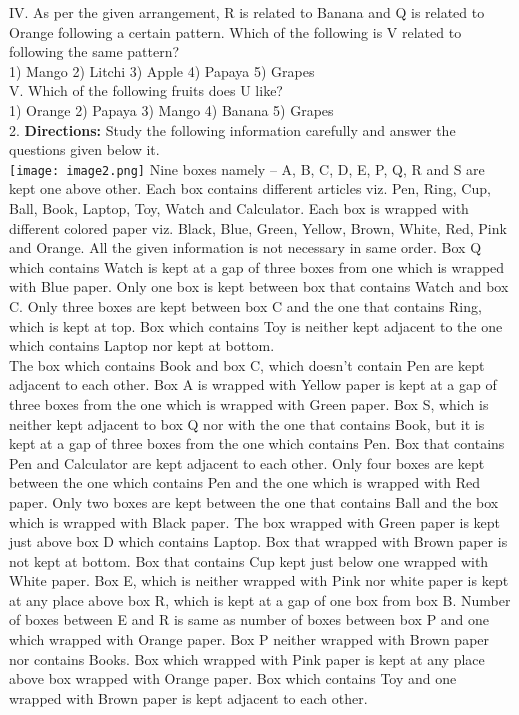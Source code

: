 \documentclass[
]{article}
\begin{document}
IV. As per the given arrangement, R is related to Banana and Q is related to Orange
following a certain pattern. Which of the following is V related to following the same
pattern?\\
1) Mango \hspace{2mm}2) Litchi \hspace{2mm}3) Apple \hspace{2mm}4) Papaya \hspace{2mm}5) Grapes\\

V. Which of the following fruits does U like?\\
1) Orange \hspace{2mm}2) Papaya \hspace{2mm}3) Mango \hspace{2mm}4) Banana \hspace{2mm}5) Grapes\\

2. \textbf{Directions:} Study the following information carefully and answer the questions given
below it.\\
\texttt{[image: image2.png]}
Nine boxes namely – A, B, C, D, E, P, Q, R and S are kept one above other. Each box contains
different articles viz. Pen, Ring, Cup, Ball, Book, Laptop, Toy, Watch and Calculator. Each
box is wrapped with different colored paper viz. Black, Blue, Green, Yellow, Brown, White,
Red, Pink and Orange. All the given information is not necessary in same order. Box Q
which contains Watch is kept at a gap of three boxes from one which is wrapped with Blue
paper. Only one box is kept between box that contains Watch and box C. Only three boxes
are kept between box C and the one that contains Ring, which is kept at top. Box which
contains Toy is neither kept adjacent to the one which contains Laptop nor kept at bottom.\\
The box which contains Book and box C, which doesn’t contain Pen are kept adjacent to
each other. Box A is wrapped with Yellow paper is kept at a gap of three boxes from the one
which is wrapped with Green paper. Box S, which is neither kept adjacent to box Q nor with
the one that contains Book, but it is kept at a gap of three boxes from the one which contains
Pen. Box that contains Pen and Calculator are kept adjacent to each other. Only four boxes
are kept between the one which contains Pen and the one which is wrapped with Red
paper. Only two boxes are kept between the one that contains Ball and the box which is
wrapped with Black paper. The box wrapped with Green paper is kept just above box D
which contains Laptop. Box that wrapped with Brown paper is not kept at bottom. Box that
contains Cup kept just below one wrapped with White paper. Box E, which is neither
wrapped with Pink nor white paper is kept at any place above box R, which is kept at a gap
of one box from box B. Number of boxes between E and R is same as number of boxes
between box P and one which wrapped with Orange paper. Box P neither wrapped with
Brown paper nor contains Books. Box which wrapped with Pink paper is kept at any place
above box wrapped with Orange paper. Box which contains Toy and one wrapped with
Brown paper is kept adjacent to each other.\\
\end{document}
